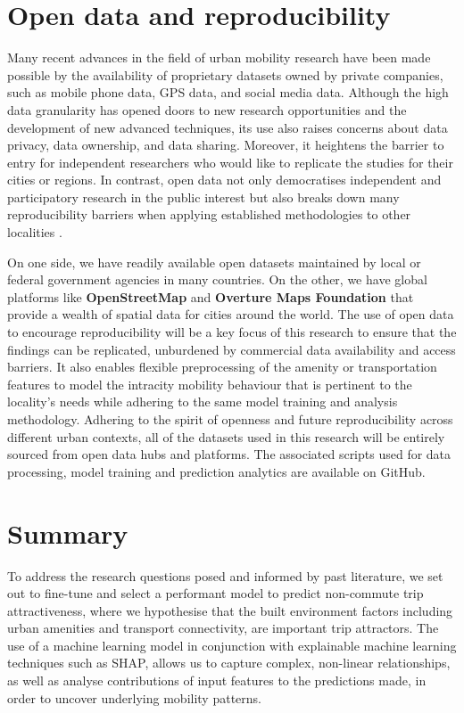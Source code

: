 \section{Open data and reproducibility}

Many recent advances in the field of urban mobility research have been made possible by the availability of proprietary datasets owned by private companies, such as mobile phone data, GPS data, and social media data. Although the high data granularity has opened doors to new research opportunities and the development of new advanced techniques, its use also raises concerns about data privacy, data ownership, and data sharing. Moreover, it heightens the barrier to entry for independent researchers who would like to replicate the studies for their cities or regions. In contrast, open data not only democratises independent and participatory research in the public interest but also breaks down many reproducibility barriers when applying established methodologies to other localities \citep{yadavRoleOpenData2017}.

On one side, we have readily available open datasets maintained by local or federal government agencies in many countries. On the other, we have global platforms like \textbf{OpenStreetMap} and \textbf{Overture Maps Foundation} that provide a wealth of spatial data for cities around the world. The use of open data to encourage reproducibility will be a key focus of this research to ensure that the findings can be replicated, unburdened by commercial data availability and access barriers. It also enables flexible preprocessing of the amenity or transportation features to model the intracity mobility behaviour that is pertinent to the locality's needs while adhering to the same model training and analysis methodology. Adhering to the spirit of openness and future reproducibility across different urban contexts, all of the datasets used in this research will be entirely sourced from open data hubs and platforms. The associated scripts used for data processing, model training and prediction analytics are available on GitHub.

\section{Summary}

To address the research questions posed and informed by past literature, we set out to fine-tune and select a performant model to predict non-commute trip attractiveness, where we hypothesise that the built environment factors including urban amenities and transport connectivity, are important trip attractors. The use of a machine learning model in conjunction with explainable machine learning techniques such as SHAP, allows us to capture complex, non-linear relationships, as well as analyse contributions of input features to the predictions made, in order to uncover underlying mobility patterns.